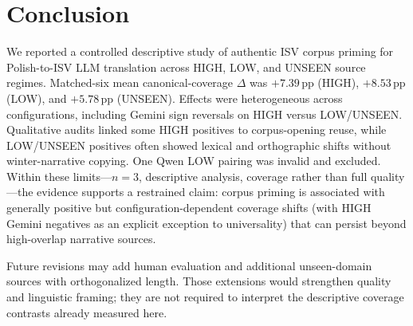 \section{Conclusion}
\label{sec:conclusion}

We reported a controlled descriptive study of authentic ISV corpus priming for Polish-to-ISV LLM translation across HIGH, LOW, and UNSEEN source regimes.
Matched-six mean canonical-coverage $\Delta$ was $+7.39$\,pp (HIGH), $+8.53$\,pp (LOW), and $+5.78$\,pp (UNSEEN).
Effects were heterogeneous across configurations, including Gemini sign reversals on HIGH versus LOW/UNSEEN.
Qualitative audits linked some HIGH positives to corpus-opening reuse, while LOW/UNSEEN positives often showed lexical and orthographic shifts without winter-narrative copying.
One Qwen LOW pairing was invalid and excluded.
Within these limits---$n{=}3$, descriptive analysis, coverage rather than full quality---the evidence supports a restrained claim: corpus priming is associated with generally positive but configuration-dependent coverage shifts (with HIGH Gemini negatives as an explicit exception to universality) that can persist beyond high-overlap narrative sources.


Future revisions may add human evaluation and additional unseen-domain sources with orthogonalized length.
Those extensions would strengthen quality and linguistic framing; they are not required to interpret the descriptive coverage contrasts already measured here.
